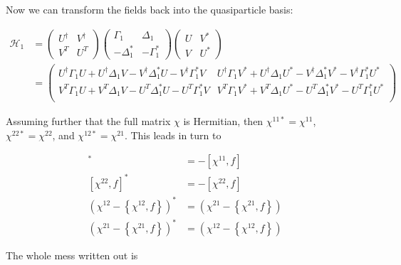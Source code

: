 Now we can transform the fields back into the quasiparticle basis:

\begin{align*}
\mathcal{H}_1 &= 
\left(\begin{array}{cc}
U^\dagger & V^\dagger \\
V^T & U^T
\end{array}\right)
\left(\begin{array}{cc}
\Gamma_1 & \Delta_1 \\
-\Delta_1^* & -\Gamma_1^*
\end{array}\right)
\left(\begin{array}{cc}
U & V^* \\
V & U^*
\end{array}\right) \\
&= \left(\begin{array}{cc}
U^\dagger\Gamma_1U + U^\dagger\Delta_1V - V^\dagger\Delta_1^*U - V^\dagger\Gamma_1^*V & 
U^\dagger\Gamma_1V^* + U^\dagger\Delta_1U^* - V^\dagger\Delta_1^*V^* - V^\dagger\Gamma_1^*U^* \\
V^T\Gamma_1U + V^T\Delta_1V - U^T\Delta_1^*U - U^T\Gamma_1^*V & 
V^T\Gamma_1V^* + V^T\Delta_1U^* - U^T\Delta_1^*V^* - U^T\Gamma_1^*U^* \\
\end{array}\right)
\end{align*}

\noindent Assuming further that the full matrix $\chi$ is Hermitian, then $\chi^{11*}=\chi^{11}$, $\chi^{22*}=\chi^{22}$, and $\chi^{12*}=\chi^{21}$. This leads in turn to

\begin{align*}
[\chi^{11},f]^* &= -[\chi^{11},f] \\
[\chi^{22},f]^* &= -[\chi^{22},f] \\
\left(\chi^{12}-\left\{\chi^{12},f\right\}\right)^* &= \left(\chi^{21}-\left\{\chi^{21},f\right\}\right) \\
\left(\chi^{21}-\left\{\chi^{21},f\right\}\right)^* &= \left(\chi^{12}-\left\{\chi^{12},f\right\}\right)
\end{align*}

The whole mess written out is

